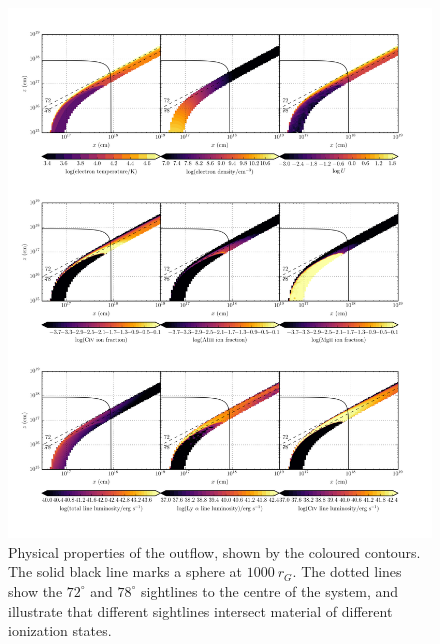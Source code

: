 \documentclass[useAMS,usenatbib]{mn2e_x}
\begin{document}
\begin{figure} %
\centering
\includegraphics[width=1.0\textwidth]{figures/link.png}
\caption
{
Physical properties of the outflow, shown by the coloured contours.
The solid black line marks a sphere at $1000~r_G$.
The dotted lines show the $72^\circ$ and $78^\circ$ sightlines 
to the centre of the system, and illustrate that different sightlines
intersect material of different ionization states.
}
\label{fig:wind}
\end{figure} %
\end{document}
